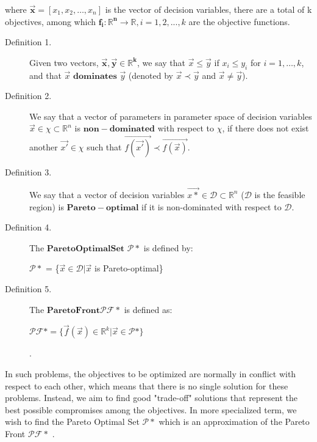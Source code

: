 \documentclass[12pt, runningheads,a4paper]{llncs}
\begin{document}
where $ \mathbf{\overrightarrow{x}}=[x_1,x_2,\ldots,x_n] $ is the vector of decision variables, there are a total of k objectives, among which $\mathbf{f_i: \mathbb{R}^n \to \mathbb{R} }, i=1,2,...,k$ are the objective functions.

\begin{description}
  \item[Definition 1.] Given two vectors, $\mathbf{\overrightarrow{x}, \overrightarrow{y} \in \mathbb{R}^k}$, we say that $\overrightarrow{x} \leq \overrightarrow{y}$ if $x_i \leq y_i$ for $i = 1, \dots, k$, and that $\overrightarrow{x}$ $\mathbf{dominates}$  $\overrightarrow{y}$ (denoted by $\overrightarrow{x} \prec \overrightarrow{y}$ and $\overrightarrow{x} \neq \overrightarrow{y}$).
\\
  \item[Definition 2.] We say that a vector of parameters in parameter space of decision variables $\overrightarrow{x} \in \chi \subset \mathbb{R}^n$ is $\mathbf{non-dominated}$ with respect to $\chi$, if there does not exist another $\overrightarrow{x'} \in \chi$ such that $\overrightarrow{f(\overrightarrow{x'})} \prec  \overrightarrow{f(\overrightarrow{x})}$.
\\
  \item[Definition 3.] We say that a vector of decision variables $\overrightarrow{x*} \in \mathcal{D} \subset \mathbb{R}^n$ ($\mathcal{D}$ is the feasible region) is $\mathbf{Pareto-optimal}$ if it is non-dominated with respect to $\mathcal{D}$.
\\
 \item[Definition 4.] The $\mathbf{Pareto Optimal Set}$  $\mathcal{P}*$ is defined by:
\begin{center} 
$\mathcal{P}*$ = \{$\overrightarrow{x} \in \mathcal{D} | \overrightarrow{x}$ is Pareto-optimal\}
\end{center}

 \item[Definition 5.] The $\mathbf{Pareto Front} \mathcal{PF}*$ is defined as:
\begin{center} 
$ \mathcal{PF}*= \{\overrightarrow{f}(\overrightarrow{x}) \in  \mathbb{R}^k | \overrightarrow{x} \in \mathcal{P}*\}$
\end{center}.
\end{description}

In such problems, the objectives to be optimized are normally in conflict with respect to each other, which means that there is no single solution for these problems. Instead, we aim to find good "trade-off" solutions that represent the best possible compromises among the objectives. In more specialized term, we wish to find the Pareto Optimal Set $\mathcal{P}*$ which is an approximation of the Pareto Front $\mathcal{PF}*$ \cite{mosurvey}. 
\end{document}
